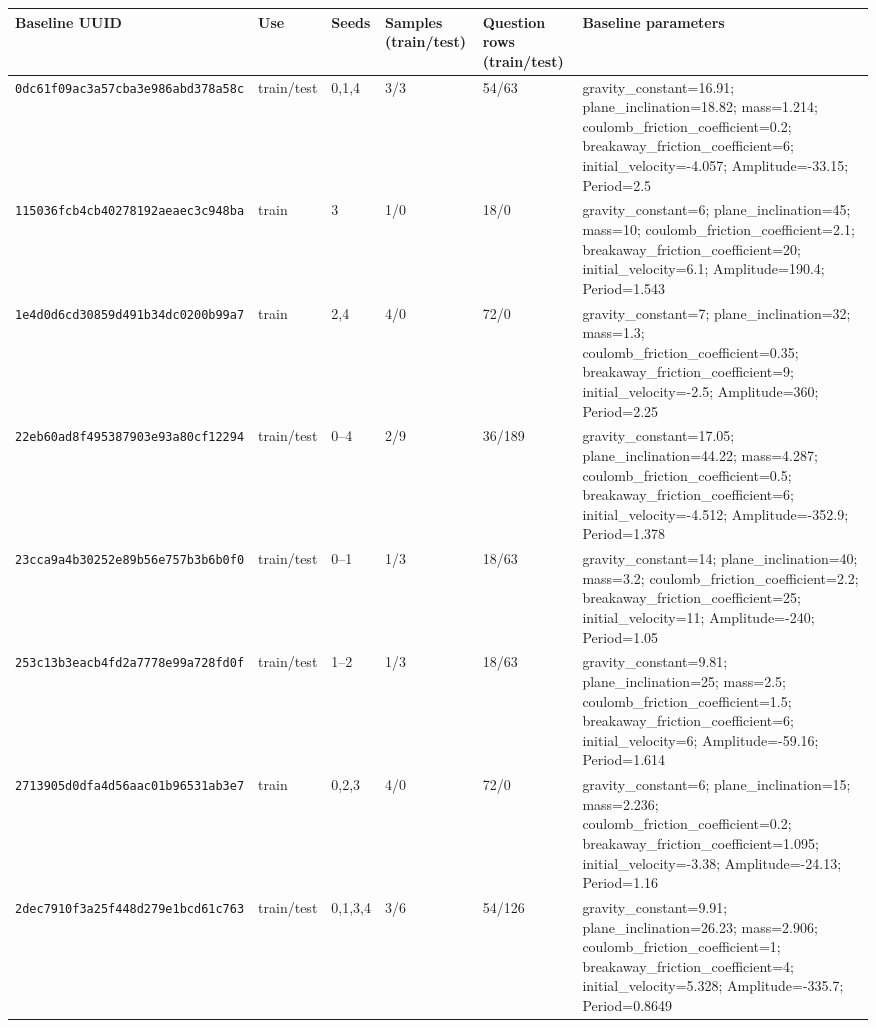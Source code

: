 \begingroup
\scriptsize
\setlength{\tabcolsep}{3pt}
\setlength{\aboverulesep}{0pt}
\setlength{\belowrulesep}{2pt}
\renewcommand{\arraystretch}{1.05}
\begin{tabular*}{\textwidth}{@{\extracolsep{\fill}}llllll@{}}
\toprule
\textbf{Baseline UUID} & \textbf{Use} & \textbf{Seeds} & \textbf{Samples (train/test)} & \textbf{Question rows (train/test)} & \textbf{Baseline parameters} \\
\midrule
\texttt{0dc61f09ac3a57cba3e986abd378a58c} & train/test & 0,1,4 & 3/3 & 54/63 & gravity\_constant=16.91; plane\_inclination=18.82; mass=1.214; coulomb\_friction\_coefficient=0.2; breakaway\_friction\_coefficient=6; initial\_velocity=-4.057; Amplitude=-33.15; Period=2.5 \\
\texttt{115036fcb4cb40278192aeaec3c948ba} & train & 3 & 1/0 & 18/0 & gravity\_constant=6; plane\_inclination=45; mass=10; coulomb\_friction\_coefficient=2.1; breakaway\_friction\_coefficient=20; initial\_velocity=6.1; Amplitude=190.4; Period=1.543 \\
\texttt{1e4d0d6cd30859d491b34dc0200b99a7} & train & 2,4 & 4/0 & 72/0 & gravity\_constant=7; plane\_inclination=32; mass=1.3; coulomb\_friction\_coefficient=0.35; breakaway\_friction\_coefficient=9; initial\_velocity=-2.5; Amplitude=360; Period=2.25 \\
\texttt{22eb60ad8f495387903e93a80cf12294} & train/test & 0--4 & 2/9 & 36/189 & gravity\_constant=17.05; plane\_inclination=44.22; mass=4.287; coulomb\_friction\_coefficient=0.5; breakaway\_friction\_coefficient=6; initial\_velocity=-4.512; Amplitude=-352.9; Period=1.378 \\
\texttt{23cca9a4b30252e89b56e757b3b6b0f0} & train/test & 0--1 & 1/3 & 18/63 & gravity\_constant=14; plane\_inclination=40; mass=3.2; coulomb\_friction\_coefficient=2.2; breakaway\_friction\_coefficient=25; initial\_velocity=11; Amplitude=-240; Period=1.05 \\
\texttt{253c13b3eacb4fd2a7778e99a728fd0f} & train/test & 1--2 & 1/3 & 18/63 & gravity\_constant=9.81; plane\_inclination=25; mass=2.5; coulomb\_friction\_coefficient=1.5; breakaway\_friction\_coefficient=6; initial\_velocity=6; Amplitude=-59.16; Period=1.614 \\
\texttt{2713905d0dfa4d56aac01b96531ab3e7} & train & 0,2,3 & 4/0 & 72/0 & gravity\_constant=6; plane\_inclination=15; mass=2.236; coulomb\_friction\_coefficient=0.2; breakaway\_friction\_coefficient=1.095; initial\_velocity=-3.38; Amplitude=-24.13; Period=1.16 \\
\texttt{2dec7910f3a25f448d279e1bcd61c763} & train/test & 0,1,3,4 & 3/6 & 54/126 & gravity\_constant=9.91; plane\_inclination=26.23; mass=2.906; coulomb\_friction\_coefficient=1; breakaway\_friction\_coefficient=4; initial\_velocity=5.328; Amplitude=-335.7; Period=0.8649 \\

\end{tabular*}

